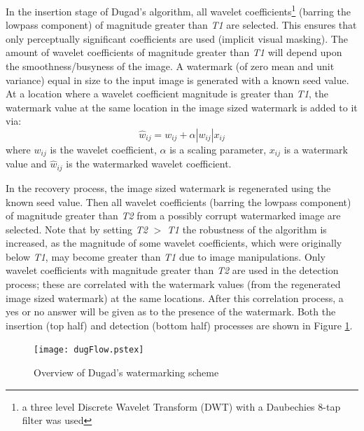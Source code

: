 \documentclass[12pt]{report}
\begin{document}
In the insertion stage of Dugad's algorithm, all wavelet coefficients\footnote{a three level Discrete Wavelet Transform (DWT) with 
a Daubechies 8-tap filter was used} (barring the lowpass component)
of magnitude greater than \emph{T1} are selected.
This ensures that only perceptually significant 
coefficients are used (implicit visual masking). The amount of wavelet coefficients of 
magnitude greater than \emph{T1} will depend upon the smoothness/busyness of the image. 
A watermark (of zero mean and unit variance) equal in size to the input 
image is generated with a known seed value. 
At a location where a wavelet coefficient magnitude is
greater than \emph{T1}, the watermark value at the same location in the image sized watermark
is added to it via:
\begin{equation}
	\hat{w}_{ij} = w_{ij} + \alpha |w_{ij}| x_{ij}
\end{equation}
where $w_{ij}$ is the wavelet coefficient, $\alpha$ is a scaling parameter, $ x_{ij}$
is a watermark value and $ \hat{w}_{ij}$ is the watermarked wavelet coefficient.

In the recovery process, the image sized watermark is regenerated using the known seed value.
Then all wavelet coefficients (barring the lowpass component)
of magnitude greater than \emph{T2} from a possibly corrupt watermarked image are selected. 
Note that by setting \emph{T2} $>$ \emph{T1} the
robustness of the algorithm is increased, as the magnitude of some wavelet coefficients, 
which were originally below \emph{T1},
may become greater than \emph{T1} due to image manipulations.
Only wavelet coefficients with  magnitude greater than \emph{T2} are 
used in the detection process; these are correlated with the 
watermark values (from the regenerated image sized watermark) at the same locations.
After this correlation process, a yes or no answer will be given 
as to the presence of the watermark. Both the insertion (top half) and detection (bottom half) processes are
shown in Figure \ref{dugFlowDI}.

\begin{figure}[htb]
\setlength{\abovecaptionskip}{-0.2cm}
	\begin{center}
		\texttt{[image: dugFlow.pstex]}
	\end{center}
	\caption{Overview of Dugad's watermarking scheme} 
	\label{dugFlowDI}
\end{figure}
 
\end{document}
